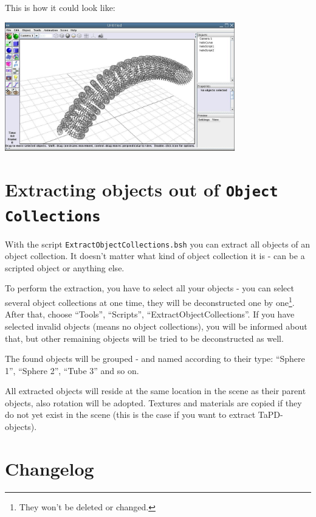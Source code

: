 \documentclass[12pt,a4paper]{scrartcl}
\begin{document}
This is how it could look like:

\begin{center}
	\includegraphics[width=0.75\textwidth]{../pics/doubleHelix.jpg}
\end{center}

\section{Extracting objects out of \texttt{Object Collections}}
With the script \texttt{ExtractObjectCollections.bsh} you can extract
all objects of an object collection. It doesn't matter what kind of
object collection it is - can be a scripted object or anything else.

To perform the extraction, you have to select all your objects - you
can select several object collections at one time, they will be 
deconstructed one by one\footnote{They won't be deleted or changed.}.
After that, choose ``Tools'', ``Scripts'', ``ExtractObjectCollections''.
If you have selected invalid objects (means no object collections), you
will be informed about that, but other remaining objects will be tried
to be deconstructed as well.

The found objects will be grouped - and named according to their type:
``Sphere 1'', ``Sphere 2'', ``Tube 3'' and so on.

All extracted objects will reside at the same location in the scene
as their parent objects, also rotation will be adopted. Textures
and materials are copied if they do not yet exist in the scene (this is
the case if you want to extract TaPD-objects).

\section{Changelog}
\end{document}
